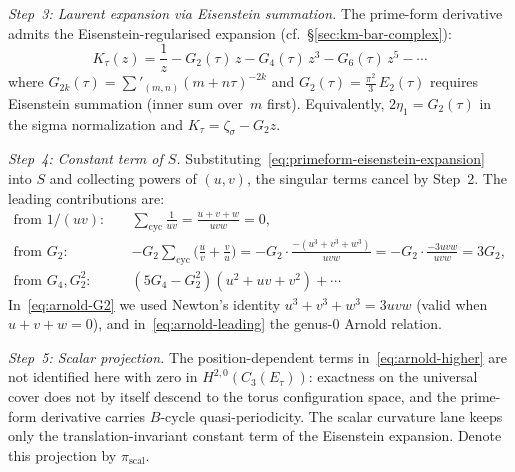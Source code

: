 \emph{Step~3: Laurent expansion via Eisenstein summation.}
The prime-form derivative admits the Eisenstein-regularised expansion
(cf.~\S\ref{sec:km-bar-complex}):
\begin{equation}\label{eq:primeform-eisenstein-expansion}
K_\tau(z)
= \frac{1}{z} - G_2(\tau)\,z - G_4(\tau)\,z^3 - G_6(\tau)\,z^5 - \cdots
\end{equation}
where $G_{2k}(\tau) = \sum'_{(m,n)} (m + n\tau)^{-2k}$
and $G_2(\tau) = \tfrac{\pi^2}{3}\,E_2(\tau)$ requires
Eisenstein summation (inner sum over~$m$ first).  Equivalently,
$2\eta_1=G_2(\tau)$ in the sigma normalization and
$K_\tau=\zeta_\sigma-G_2z$.

\emph{Step~4: Constant term of $S$.}
Substituting~\eqref{eq:primeform-eisenstein-expansion} into $S$
and collecting powers of $(u,v)$, the singular terms cancel
by Step~2. The leading contributions are:
\begin{align}
\text{from }1/(uv):\quad
 &\textstyle\sum_{\mathrm{cyc}} \frac{1}{uv}
 = \frac{u + v + w}{uvw} = 0,
 \label{eq:arnold-leading}\\[4pt]
\text{from }G_2:\quad
 &\textstyle -G_2 \sum_{\mathrm{cyc}}\bigl(\tfrac{u}{v}
 + \tfrac{v}{u}\bigr)
 = -G_2 \cdot \frac{-(u^3 + v^3 + w^3)}{uvw}
 = -G_2 \cdot \frac{-3uvw}{uvw} = 3G_2,
 \label{eq:arnold-G2}\\[4pt]
\text{from }G_4, G_2^2:\quad
 &(5G_4 - G_2^2)(u^2 + uv + v^2) + \cdots
 \label{eq:arnold-higher}
\end{align}
In~\eqref{eq:arnold-G2} we used Newton's identity
$u^3 + v^3 + w^3 = 3uvw$ (valid when $u + v + w = 0$), and
in~\eqref{eq:arnold-leading} the genus-$0$ Arnold relation.

\emph{Step~5: Scalar projection.}
The position-dependent terms in~\eqref{eq:arnold-higher} are not
identified here with zero in $H^{2,0}(C_3(E_\tau))$: exactness on the
universal cover does not by itself descend to the torus configuration
space, and the prime-form derivative carries $B$-cycle
quasi-periodicity.  The scalar curvature lane keeps only the
translation-invariant constant term of the Eisenstein expansion.
Denote this projection by $\pi_{\mathrm{scal}}$.


